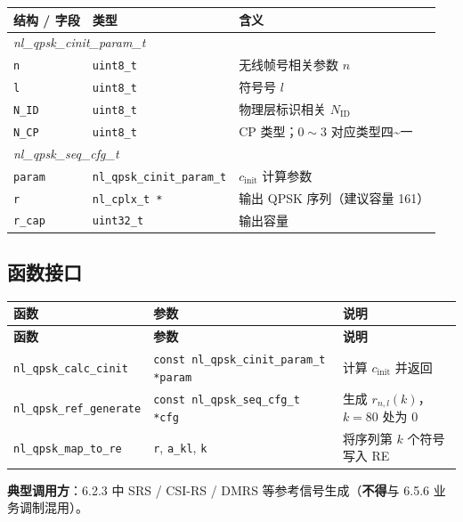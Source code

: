 \documentclass[11pt,a4paper]{ctexart}
\begin{document}
\begin{table}[h]
\centering
\small
\begin{tabular}{lll}
\toprule
\textbf{结构 / 字段} & \textbf{类型} & \textbf{含义} \\
\midrule
\multicolumn{3}{l}{\textit{nl\_qpsk\_cinit\_param\_t}} \\
\texttt{n} & \texttt{uint8\_t} & 无线帧号相关参数 $n$ \\
\texttt{l} & \texttt{uint8\_t} & 符号号 $l$ \\
\texttt{N\_ID} & \texttt{uint8\_t} & 物理层标识相关 $N_{\mathrm{ID}}$ \\
\texttt{N\_CP} & \texttt{uint8\_t} & CP 类型；$0\sim 3$ 对应类型四\textasciitilde 一 \\
\midrule
\multicolumn{3}{l}{\textit{nl\_qpsk\_seq\_cfg\_t}} \\
\texttt{param} & \texttt{nl\_qpsk\_cinit\_param\_t} & $c_{\mathrm{init}}$ 计算参数 \\
\texttt{r} & \texttt{nl\_cplx\_t *} & 输出 QPSK 序列（建议容量 161） \\
\texttt{r\_cap} & \texttt{uint32\_t} & 输出容量 \\
\bottomrule
\end{tabular}
\end{table}

\subsection{函数接口}

\begin{longtable}{@{}L{4.6cm}L{5.2cm}L{4.7cm}@{}}
\toprule
\textbf{函数} & \textbf{参数} & \textbf{说明} \\
\midrule
\endfirsthead
\toprule\textbf{函数}&\textbf{参数}&\textbf{说明}\\\midrule\endhead
\texttt{nl\_qpsk\_calc\_cinit} & \texttt{const nl\_qpsk\_cinit\_param\_t *param} & 计算 $c_{\mathrm{init}}$ 并返回 \\
\texttt{nl\_qpsk\_ref\_generate} & \texttt{const nl\_qpsk\_seq\_cfg\_t *cfg} & 生成 $r_{n,l}(k)$，$k{=}80$ 处为 0 \\
\texttt{nl\_qpsk\_map\_to\_re} & \texttt{r}, \texttt{a\_kl}, \texttt{k} & 将序列第 $k$ 个符号写入 RE \\
\bottomrule
\end{longtable}

\textbf{典型调用方}：6.2.3 中 SRS / CSI-RS / DMRS 等参考信号生成（\textbf{不得}与 6.5.6 业务调制混用）。
\end{document}
